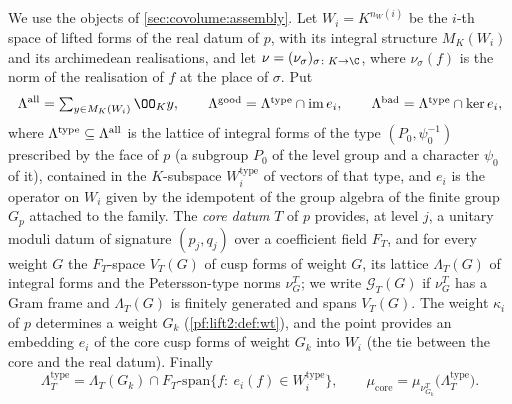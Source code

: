 \begin{definition}\label{pf:lift2:def:lat}
We use the objects of \cref{sec:covolume:assembly}. Let $W_i=K^{n_W(i)}$ be the $i$-th space of lifted forms of
the real datum of $p$, with its integral structure $M_K(W_i)$ and its archimedean realisations, and let
$\nu=(\nu_\sigma)_{\sigma\colon K\to\C}$, where $\nu_\sigma(f)$ is the norm of the realisation of $f$ at the place of
$\sigma$. Put
\[
\lifttwoLat{all}=\textstyle\sum_{y\in M_K(W_i)}\OO_Ky,\qquad
\lifttwoLat{good}=\lifttwoLat{type}\cap\operatorname{im}e_i,\qquad \lifttwoLat{bad}=\lifttwoLat{type}\cap\ker e_i,
\]
where $\Lambda^{\mathrm{type}}\subseteq\Lambda^{\mathrm{all}}$ is the lattice of integral forms of the type $(P_0,\psi_0^{-1})$
prescribed by the face of $p$ (a subgroup $P_0$ of the level group and a character $\psi_0$ of it), contained in the
$K$-subspace $W_i^{\mathrm{type}}$ of vectors of that type, and $e_i$ is the operator on $W_i$ given by the
idempotent of the group algebra of the finite group $G_p$ attached to the family. The \emph{core datum} $T$ of $p$
provides, at level $j$, a unitary moduli datum of signature $(p_j,q_j)$ over a coefficient field $F_T$, and for every
weight $G$ the $F_T$-space $V_T(G)$ of cusp forms of weight $G$, its lattice $\Lambda_T(G)$ of integral forms and the
Petersson-type norms $\nu^T_G$; we write $\mathcal G_T(G)$ if $\nu^T_G$ has a Gram frame and $\Lambda_T(G)$ is finitely
generated and spans $V_T(G)$. The weight $\kappa_i$ of $p$ determines a weight $G_k$ (\cref{pf:lift2:def:wt}),
and the point provides an embedding $e_i$ of the core cusp forms of weight $G_k$ into $W_i$ (the tie between the
core and the real datum). Finally
\[
\Lambda^{\mathrm{type}}_T=\Lambda_T(G_k)\cap F_T\text{-span}\{f:\ e_i(f)\in W_i^{\mathrm{type}}\},\qquad
\mu_{\mathrm{core}}=\mu_{\nu^T_{G_k}}\bigl(\Lambda^{\mathrm{type}}_T\bigr).
\]
\end{definition}

